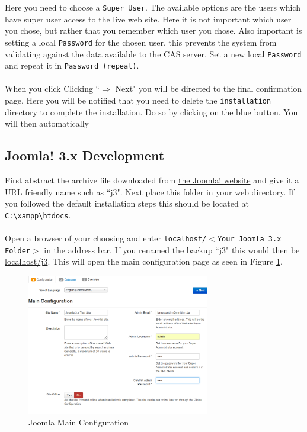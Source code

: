 \documentclass[]{report}
\begin{document}
\noindent
Here you need to choose a \texttt{Super User}. The available options are the users which have super user access to the live web site. Here it is not important which user you chose, but rather that you remember which user you chose. Also important is setting a local \texttt{Password} for the chosen user, this prevents the system from validating against the data available to the CAS server. Set a new local  \texttt{Password} and repeat it in  \texttt{Password (repeat)}.\\
\\
When you click Clicking ``$\Rightarrow$ Next" you will be directed to the final confirmation page. Here you will be notified that you need to delete the \texttt{installation} directory to complete the installation. Do so by clicking on the blue button. You will then automatically 

\subsection{Joomla! 3.x Development}

First abstract the archive file downloaded from \href{http://www.joomla.org/download.html}{the Joomla! website} and give it a URL friendly name such as ``j3". Next place this folder in your web directory. If you followed the default installation steps this should be located at \texttt{C:\textbackslash xampp\textbackslash htdocs}.\\
\\
Open a browser of your choosing and enter \texttt{localhost/$<$Your Joomla 3.x Folder$>$} in the address bar. If you renamed the backup ``j3" this would then be \url{localhost/j3}. This will open the main configuration page as seen in Figure \ref{fig:j3mainconfiguration}.

\newpage

\begin{figure}[h] 
	\centering
	\includegraphics[width=8cm]{j3mainconfiguration.png}
	\caption{Joomla Main Configuration}
	\label{fig:j3mainconfiguration}
\end{figure}
\end{document}
